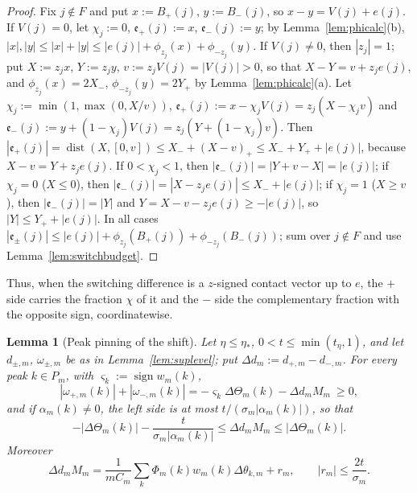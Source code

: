 \documentclass[10pt]{amsart}
\newtheorem{lemma}[theorem]{Lemma}
\theoremstyle{definition}
\theoremstyle{remark}
\newcommand{\sgn}{\operatorname{sign}}
\newcommand{\dist}{\operatorname{dist}}
\begin{document}
\begin{proof}
Fix $j\notin F$ and put $x:=B_+(j)$, $y:=B_-(j)$, so $x-y=V(j)+e(j)$.  If
$V(j)=0$, let $\chi_j:=0$, $\mathfrak e_+(j):=x$, $\mathfrak e_-(j):=y$; by
Lemma~\ref{lem:phicalc}(b), $|x|,|y|\le|x|+|y|\le|e(j)|+\phi_{z_j}(x)+
\phi_{-z_j}(y)$.  If $V(j)\ne0$, then $|z_j|=1$; put $X:=z_jx$,
$Y:=z_jy$, $v:=z_jV(j)=|V(j)|>0$, so that $X-Y=v+z_je(j)$, and
$\phi_{z_j}(x)=2X_-$, $\phi_{-z_j}(y)=2Y_+$ by Lemma~\ref{lem:phicalc}(a).
Let $\chi_j:=\min(1,\max(0,X/v))$, $\mathfrak e_+(j):=x-\chi_jV(j)=
z_j(X-\chi_jv)$ and $\mathfrak e_-(j):=y+(1-\chi_j)V(j)=z_j(Y+(1-\chi_j)v)$.
Then $|\mathfrak e_+(j)|=\dist(X,[0,v])\le X_-+(X-v)_+\le X_-+Y_++|e(j)|$,
because $X-v=Y+z_je(j)$.  If $0<\chi_j<1$, then $|\mathfrak e_-(j)|=
|Y+v-X|=|e(j)|$; if $\chi_j=0$ ($X\le0$), then $|\mathfrak e_-(j)|=
|X-z_je(j)|\le X_-+|e(j)|$; if $\chi_j=1$ ($X\ge v$), then $|\mathfrak
e_-(j)|=|Y|$ and $Y=X-v-z_je(j)\ge-|e(j)|$, so $|Y|\le Y_++|e(j)|$.  In all
cases $|\mathfrak e_\pm(j)|\le|e(j)|+\phi_{z_j}(B_+(j))+\phi_{-z_j}(B_-(j))$;
sum over $j\notin F$ and use Lemma~\ref{lem:switchbudget}.
\end{proof}

Thus, when the switching difference is a $z$-signed contact vector up to
$e$, the $+$ side carries the fraction $\chi$ of it and the $-$ side the
complementary fraction with the opposite sign, coordinatewise.

\begin{lemma}[Peak pinning of the shift]\label{lem:peakshift}
Let $\eta\le\eta_*$, $0<t\le\min(t_\eta,1)$, and let $d_{\pm,m}$,
$\omega_{\pm,m}$ be as in Lemma~\ref{lem:suplevel};
put $\Delta d_m:=d_{+,m}-d_{-,m}$.  For every peak $k\in P_m$, with
$\varsigma_k:=\sgn w_m(k)$,
\begin{equation}\label{eq:peakshift}
 |\omega_{+,m}(k)|+|\omega_{-,m}(k)|=-\varsigma_k\Delta\Theta_m(k)-
 \Delta d_mM_m\ \ge0,
\end{equation}
and if $\alpha_m(k)\ne0$, the left side is at most
$t/(\sigma_m|\alpha_m(k)|)$, so that
\[
 -|\Delta\Theta_m(k)|-\frac t{\sigma_m|\alpha_m(k)|}\le\Delta d_mM_m\le
 |\Delta\Theta_m(k)|.
\]
Moreover
\begin{equation}\label{eq:didentity}
 \Delta d_mM_m=\frac1{mC_m}\sum_k\Phi_m(k)w_m(k)\Delta\theta_{k,m}+r_m,
 \qquad|r_m|\le\frac{2t}{\sigma_m}.
\end{equation}
\end{lemma}
\end{document}
